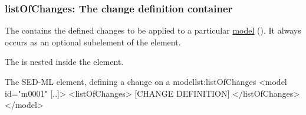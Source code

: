   \subsubsection{listOfChanges: The change definition container}
\label{sec:listOfChanges}
The  contains the defined changes to be applied to a particular \hyperref[class:model]{model} (). 
%
%
It always occurs as an optional subelement of the  element. 

The  is nested inside the  element.
%
\begin{myXmlLst}{The SED-ML  element, defining a change on a model}{lst:listOfChanges}
<model id="m0001" [..]>
 <listOfChanges>
  [CHANGE DEFINITION]
 </listOfChanges>
</model>
\end{myXmlLst}
%


